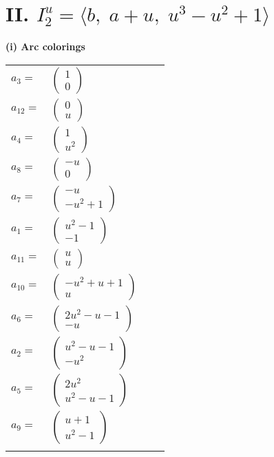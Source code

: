 \documentclass[1p]{elsarticle_modified}
\theoremstyle{definition}
\begin{document}
\centering \section*{II. $I^u_{2}= \langle b,\;a+u,\;u^3- u^2+1 \rangle$}
\flushleft \textbf{(i) Arc colorings}\\
\begin{tabular}{m{7pt} m{180pt} m{7pt} m{180pt} }
\flushright $a_{3}=$&$\begin{pmatrix}1\\0\end{pmatrix}$ \\
\flushright $a_{12}=$&$\begin{pmatrix}0\\u\end{pmatrix}$ \\
\flushright $a_{4}=$&$\begin{pmatrix}1\\u^2\end{pmatrix}$ \\
\flushright $a_{8}=$&$\begin{pmatrix}- u\\0\end{pmatrix}$ \\
\flushright $a_{7}=$&$\begin{pmatrix}- u\\- u^2+1\end{pmatrix}$ \\
\flushright $a_{1}=$&$\begin{pmatrix}u^2-1\\-1\end{pmatrix}$ \\
\flushright $a_{11}=$&$\begin{pmatrix}u\\u\end{pmatrix}$ \\
\flushright $a_{10}=$&$\begin{pmatrix}- u^2+u+1\\u\end{pmatrix}$ \\
\flushright $a_{6}=$&$\begin{pmatrix}2 u^2- u-1\\- u\end{pmatrix}$ \\
\flushright $a_{2}=$&$\begin{pmatrix}u^2- u-1\\- u^2\end{pmatrix}$ \\
\flushright $a_{5}=$&$\begin{pmatrix}2 u^2\\u^2- u-1\end{pmatrix}$ \\
\flushright $a_{9}=$&$\begin{pmatrix}u+1\\u^2-1\end{pmatrix}$\\&\end{tabular}
\end{document}
